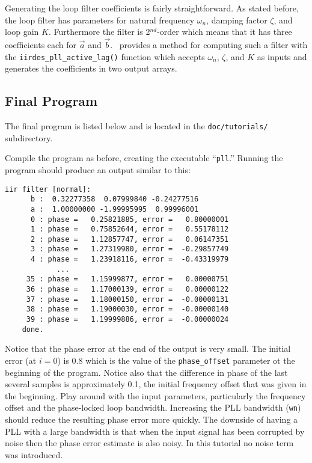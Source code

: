 Generating the loop filter coefficients is fairly straightforward.
As stated before, the loop filter has parameters for
natural frequency $\omega_n$,
damping factor $\zeta$, and
loop gain $K$.
Furthermore the filter is 2$^{nd}$-order which means that it has three
coefficients each for $\vec{a}$ and $\vec{b}$.
\liquid\ provides a method for computing such a filter with the
{\tt iirdes\_pll\_active\_lag()} function
which accepts $\omega_n$, $\zeta$, and $K$ as inputs and generates the
coefficients in two output arrays.



\subsection{Final Program}
\label{tutorial:pll:completed}

The final program is listed below and is located in the
{\tt doc/tutorials/} subdirectory.
%

%
Compile the program as before, creating the executable ``{\tt pll}.''
Running the program should produce an output similar to this:
\begin{Verbatim}[fontsize=\small]
    iir filter [normal]:
      b :  0.32277358  0.07999840 -0.24277516
      a :  1.00000000 -1.99995995  0.99996001
      0 : phase =   0.25821885, error =   0.80000001
      1 : phase =   0.75852644, error =   0.55178112
      2 : phase =   1.12857747, error =   0.06147351
      3 : phase =   1.27319980, error =  -0.29857749
      4 : phase =   1.23918116, error =  -0.43319979
            ...
     35 : phase =   1.15999877, error =   0.00000751
     36 : phase =   1.17000139, error =   0.00000122
     37 : phase =   1.18000150, error =  -0.00000131
     38 : phase =   1.19000030, error =  -0.00000140
     39 : phase =   1.19999886, error =  -0.00000024
    done.
\end{Verbatim}
%
Notice that the phase error at the end of the output is very small.
The initial error (at $i=0$) is 0.8 which is the value of the
{\tt phase\_offset} parameter ot the beginning of the program.
Notice also that the difference in phase of the last several samples is
approximately 0.1, the initial frequency offset that was given in the
beginning.
Play around with the input parameters, particularly the frequency offset
and the phase-locked loop bandwidth.
Increasing the PLL bandwidth ({\tt wn}) should reduce the resulting
phase error more quickly.
The downside of having a PLL with a large bandwidth is that when the
input signal has been corrupted by noise then the phase error estimate
is also noisy.
In this tutorial no noise term was introduced. %

